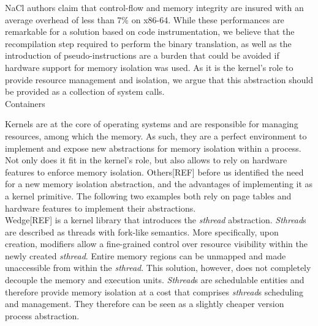 \documentclass[letterpaper,twocolumn,10pt]{article}
\begin{document}
NaCl authors claim that control-flow and memory integrity are insured with an average overhead of less than 7\% on x86-64.
While these performances are remarkable for a solution based on code instrumentation, we believe that the recompilation step required to perform the binary translation, as well as the introduction of pseudo-instructions are a burden that could be avoided if hardware support for memory isolation was used.
As it is the kernel's role to provide resource management and isolation, we argue that this abstraction should be provided as a collection of system calls.\\


Containers 

Kernels are at the core of operating systems and are responsible for managing resources, among which the memory.
As such, they are a perfect environment to implement and expose new abstractions for memory isolation within a process.
Not only does it fit in the kernel's role, but also allows to rely on hardware features to enforce memory isolation.
Others[REF] before us identified the need for a new memory isolation abstraction, and the advantages of implementing it as a kernel primitive.
The following two examples both rely on page tables and hardware features to implement their abstractions. \\

Wedge[REF] is a kernel library that introduces the \emph{sthread} abstraction.
\emph{Sthread}s are described as threads with fork-like semantics.
More specifically, upon creation, modifiers allow a fine-grained control over resource visibility within the newly created \emph{sthread}.
Entire memory regions can be unmapped and made unaccessible from within the \emph{sthread}.
This solution, however, does not completely decouple the memory and execution units.
\emph{Sthread}s are schedulable entities and therefore provide memory isolation at a cost that comprises \emph{sthread}s scheduling and management.
They therefore can be seen as a slightly cheaper version process abstraction.\\
\end{document}
